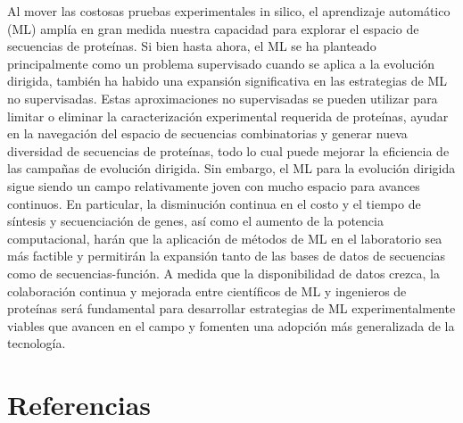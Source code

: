 \documentclass[12pt]{article}
\begin{document}
Al mover las costosas pruebas experimentales in silico, el aprendizaje automático (ML) amplía en gran medida nuestra capacidad para explorar el espacio de secuencias de proteínas. Si bien hasta ahora, el ML se ha planteado principalmente como un problema supervisado cuando se aplica a la evolución dirigida, también ha habido una expansión significativa en las estrategias de ML no supervisadas. Estas aproximaciones no supervisadas se pueden utilizar para limitar o eliminar la caracterización experimental requerida de proteínas, ayudar en la navegación del espacio de secuencias combinatorias y generar nueva diversidad de secuencias de proteínas, todo lo cual puede mejorar la eficiencia de las campañas de evolución dirigida. Sin embargo, el ML para la evolución dirigida sigue siendo un campo relativamente joven con mucho espacio para avances continuos. En particular, la disminución continua en el costo y el tiempo de síntesis y secuenciación de genes, así como el aumento de la potencia computacional, harán que la aplicación de métodos de ML en el laboratorio sea más factible y permitirán la expansión tanto de las bases de datos de secuencias como de secuencias-función. A medida que la disponibilidad de datos crezca, la colaboración continua y mejorada entre científicos de ML y ingenieros de proteínas será fundamental para desarrollar estrategias de ML experimentalmente viables que avancen en el campo y fomenten una adopción más generalizada de la tecnología.



\section{Referencias}
\end{document}
